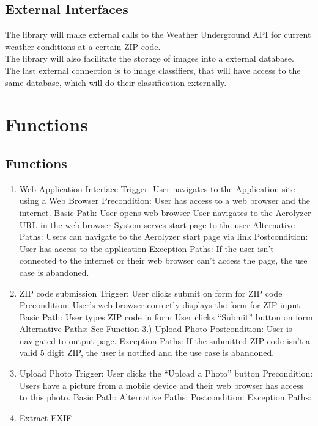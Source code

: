 \documentclass[journal,10pt,draftclsnofoot,onecolumn]{IEEEtran}
\begin{document}
\begin{singlespace}
\subsection{External Interfaces}
The library will make external calls to the Weather Underground API for current weather conditions at a certain ZIP code.\\
The library will also facilitate the storage of images into a external database.\\
The last external connection is to image classifiers, that will have access to the same database, which will do their classification externally.

\section{Functions}
\subsection{Functions}
\begin{enumerate}
\item Web Application Interface
Trigger: User navigates to the Application site using a Web Browser
Precondition: User has access to a web browser and the internet.
Basic Path:
User opens web browser
User navigates to the Aerolyzer URL in the web browser
System serves start page to the user
Alternative Paths: Users can navigate to the Aerolyzer start page via link
Postcondition: User has access to the application
Exception Paths: If the user isn't connected to the internet or their web browser can't access the page, the use case is abandoned.
\\
\item ZIP code submission
Trigger: User clicks submit on form for ZIP code
Precondition: User's web browser correctly displays the form for ZIP input.
Basic Path:
User types ZIP code in form
User clicks “Submit” button on form
Alternative Paths: See Function 3.) Upload Photo
Postcondition: User is navigated to output page.
Exception Paths: If the submitted ZIP code isn't a valid 5 digit ZIP, the user is notified and the use case is abandoned.
\\
\item Upload Photo
Trigger: User clicks the “Upload a Photo” button
Precondition: Users have a picture from a mobile device and their web browser has access to this photo.
Basic Path:
Alternative Paths:
Postcondition:
Exception Paths: 
\\
\item Extract EXIF

\end{enumerate}
\end{singlespace}
\end{document}
